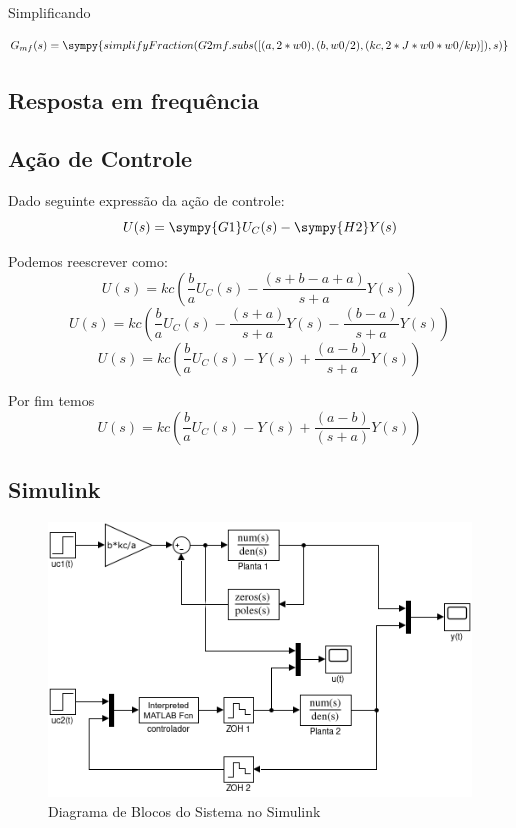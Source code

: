 \documentclass[a4paper,11pt]{article}
\begin{document}
Simplificando

\begin{equation}
    G_{mf}(s) = \sympy{simplifyFraction(G2mf.subs([(a,2*w0),(b,w0/2),(kc,2*J*w0*w0/kp)]),s)}
\end{equation}

\subsection{Resposta em frequência}
\subsection{Ação de Controle}

Dado seguinte expressão da ação de controle:
$$U(s) = \sympy{G1}U_C(s) - \sympy{H2}Y(s)$$

Podemos reescrever como:
$$U(s) = kc\left( \frac{b}{a}U_C(s) - \frac{(s+b-a+a)}{s+a}Y(s) \right)$$
$$U(s) = kc\left( \frac{b}{a}U_C(s) - \frac{(s+a)}{s+a}Y(s) - \frac{(b-a)}{s+a}Y(s) \right)$$
$$U(s) = kc\left( \frac{b}{a}U_C(s) - Y(s) + \frac{(a-b)}{s+a}Y(s) \right)$$

Por fim temos
\begin{equation}
    U(s) = kc\left( \frac{b}{a}U_C(s) - Y(s) + \frac{(a-b)}{(s+a)}Y(s) \right)
\end{equation}

\subsection{Simulink}

\begin{figure}[H]
    \centering
    \label{fig:ex2-simulink}
    \includegraphics[width=0.8\linewidth]{img/exsim2model.png}
    \caption{Diagrama de Blocos do Sistema no Simulink}
\end{figure}
\end{document}

